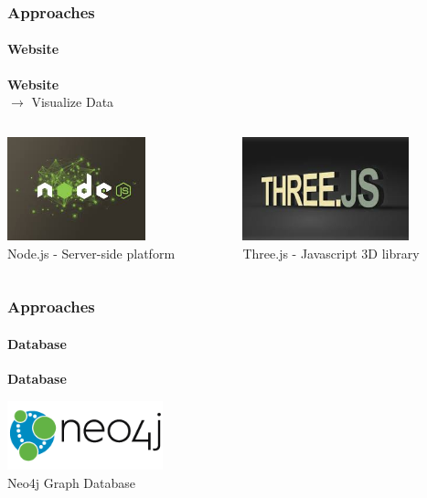 \documentclass{beamer}
\begin{document}
	 \begin{frame}
    \frametitle{Approaches}
		\framesubtitle{Website}
		\textbf{Website} \\
		$\rightarrow$ Visualize Data
    \begin{columns}[T] %
     \begin{column}[T]{5cm} %
			\begin{center}
     \includegraphics[height=3cm]{nodejs.jpg}\\
			Node.js - Server-side platform
			\end{center}
     \end{column}
     \begin{column}[T]{5cm} %
		\begin{center}
		 \includegraphics[height=3cm]{threejs.jpg} \\
			Three.js - Javascript 3D library
			\end{center}
     \end{column}
     \end{columns}
  \end{frame}
	
	\begin{frame}
		\frametitle{Approaches}
		\framesubtitle{Database}
		\textbf{Database} \\ 
			\begin{center}
      \includegraphics[height=2cm]{neo4j.png}\\
			Neo4j Graph Database
			\end{center}
  \end{frame}
	
\end{document}
